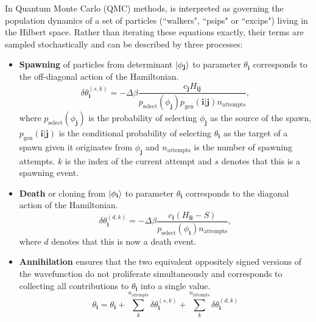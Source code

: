 \documentclass[%
 reprint,
 amsmath,amssymb,
 aps,
]{revtex4-2}
\begin{document}
In Quantum Monte Carlo (QMC) methods,  is interpreted as governing the population dynamics of a set of particles (``walkers", ``psips" or ``excips") living in the Hilbert space. Rather than iterating these equations exactly, their terms are sampled stochastically and can be described by three processes:\cite{Booth2009}
\begin{itemize}
\item \textbf{Spawning} of particles from determinant $\ket{\phi_\mathbf{j}}$ to parameter $\theta_\mathbf{i}$ corresponds to the off-diagonal action of the Hamiltonian.
\begin{equation} 
\delta \theta_\mathbf{i}^{(s, k)} = - \Delta\beta \frac{c_\mathbf{j}H_\mathbf{ij}}{p_\mathrm{select}(\phi_\mathbf{j}) p_\mathrm{gen}(\mathbf{i}|\mathbf{j}) n_\mathrm{attempts}},
\label{eq:pspawn}
\end{equation}
where $p_\mathrm{select}(\phi_\mathbf{j})$ is the probability of selecting $\phi_\mathbf{j}$ as the source of the spawn, $p_\mathrm{gen}(\mathbf{i}|\mathbf{j})$ is the conditional probability of selecting $\theta_\mathbf{i}$ as the target of a spawn given it originates from $\phi_\mathbf{j}$ and $n_\mathrm{attempts}$ is the number of spawning attempts. $k$ is the index of the current attempt and $s$ denotes that this is a spawning event.
\item \textbf{Death} or cloning from $\ket{\phi_\mathbf{i}}$ to parameter $\theta_\mathbf{i}$ corresponds to the diagonal action of the Hamiltonian.
\begin{equation} 
\delta \theta_\mathbf{i}^{(d, k)} = - \Delta\beta \frac{c_\mathbf{i} (H_\mathbf{ii} - S)}{p_\mathrm{select}(\phi_\mathbf{i}) n_\mathrm{attempts}},
\end{equation}
where $d$ denotes that this is now a death event.
\item \textbf{Annihilation} ensures that the two equivalent oppositely signed versions of the wavefunction do not proliferate simultaneously and corresponds to collecting all contributions to $\theta_\mathbf{i}$ into a single value.
\begin{equation}
\theta_\mathbf{i} = \theta_\mathbf{i} + \sum_k^{n_\mathrm{attempts}}\delta \theta_\mathbf{i}^{(s, k)} + \sum_k^{n_\mathrm{attempts}}\delta \theta_\mathbf{i}^{(d, k)}
\end{equation}
\end{itemize}
\end{document}
